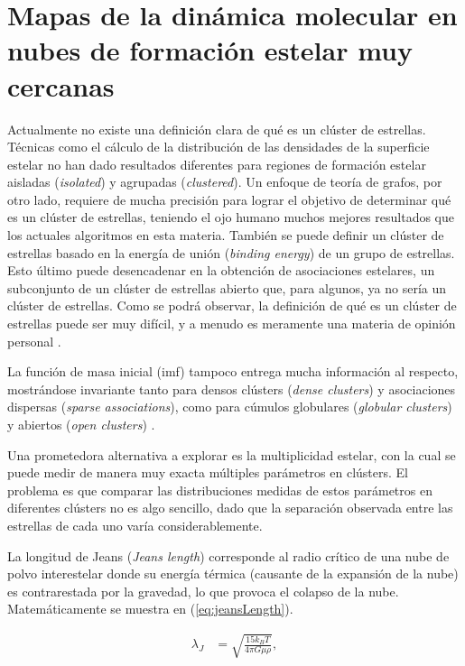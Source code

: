\section{Mapas de la dinámica molecular en nubes de formación estelar muy cercanas}

Actualmente no existe una definición clara de qu\'e es un clúster de estrellas. T\'ecnicas como el cálculo de la distribución de las densidades de la superficie estelar no han dado resultados diferentes para regiones de formación estelar aisladas (\emph{isolated}) y agrupadas (\emph{clustered}). Un enfoque de teoría de grafos, por otro lado, requiere de mucha precisión para lograr el objetivo de determinar qu\'e es un clúster de estrellas, teniendo el ojo humano muchos mejores resultados que los actuales algoritmos en esta materia. Tambi\'en se puede definir un clúster de estrellas basado en la energía de unión (\emph{binding energy}) de un grupo de estrellas. Esto último puede desencadenar en la obtención de asociaciones estelares, un subconjunto de un clúster de estrellas abierto que, para algunos, ya no sería un clúster de estrellas. Como se podrá observar, la definición de qu\'e es un clúster de estrellas puede ser muy difícil, y a menudo es meramente una materia de opinión personal \cite{CSFreview}. 

La función de masa inicial (\gls{imf}) tampoco entrega mucha información al respecto, mostrándose invariante tanto para densos clústers (\emph{dense clusters}) y asociaciones dispersas (\emph{sparse associations}), como para cúmulos globulares (\emph{globular clusters}) y abiertos (\emph{open clusters}) \cite{CSFreview}.

Una prometedora alternativa a explorar es la multiplicidad estelar, con la cual se puede medir de manera muy exacta múltiples parámetros en clústers. El problema es que comparar las distribuciones medidas de estos parámetros en diferentes clústers no es algo sencillo, dado que la separación observada entre las estrellas de cada uno varía considerablemente. 

La longitud de Jeans (\emph{Jeans length}) corresponde al radio crítico de una nube de polvo interestelar donde su energía t\'ermica (causante de la expansión de la nube) es contrarestada por la gravedad, lo que provoca el colapso de la nube. Matemáticamente se muestra en (\ref{eq:jeansLength}).

\begin{align}\label{eq:jeansLength}
	\lambda_J &= \sqrt{\frac{15k_BT}{4\pi G\mu\rho}},
\end{align}


